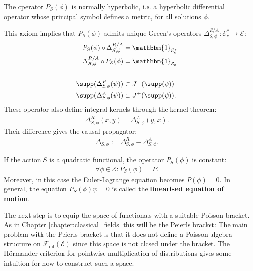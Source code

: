     \begin{axiom}
        The operator $P_S(\phi)$ is normally hyperbolic, i.e. a hyperbolic differential operator whose principal symbol defines a metric, for all solutions $\phi$.
    \end{axiom}

    This axiom implies that $P_S(\phi)$ admits unique Green's operators $\Delta^{R/A}_{S,\phi}:\mathcal{E}^*_c\rightarrow\mathcal{E}$:
    \begin{align}
        P_S(\phi)\circ\Delta^{R/A}_{S,\phi} &= \mathbbm{1}_{\mathcal{E}^*_c}\\
        \Delta^{R/A}_{S,\phi}\circ P_S(\phi) &= \mathbbm{1}_{\mathcal{E}_c}\\&\nonumber\\
        \supp(\Delta^R_{S,\phi}(\psi)) &\subset J^-(\supp(\psi))\\
        \supp(\Delta^A_{S,\phi}(\psi)) &\subset J^+(\supp(\psi)).
    \end{align}
    These operator also define integral kernels through the kernel theorem:
    \begin{gather}
        \Delta^R_{S,\phi}(x,y) = \Delta^A_{S,\phi}(y,x).
    \end{gather}
    Their difference gives the causal propagator:
    \begin{gather}
        \Delta_{S,\phi} := \Delta^R_{S,\phi} - \Delta^A_{S,\phi}.
    \end{gather}

    \begin{property}
        If the action $S$ is a quadratic functional, the operator $P_S(\phi)$ is constant:
        \begin{gather}
            \forall\phi\in\mathcal{E}:P_S(\phi)=P.
        \end{gather}
        Moreover, in this case the Euler-Lagrange equation becomes $P(\phi) = 0$. In general, the equation $P_S(\phi)\psi=0$ is called the \textbf{linearised equation of motion}.
    \end{property}

    The next step is to equip the space of functionals with a suitable Poisson bracket. As in Chapter \ref{chapter:classical_fields} this will be the Peierls bracket:
    The main problem with the Peierls bracket is that it does not define a Poisson algebra structure on $\mathcal{F}_\mathrm{ml}(\mathcal{E})$ since this space is not closed under the bracket. The H\"ormander criterion for pointwise multiplication of distributions gives some intuition for how to construct such a space.

